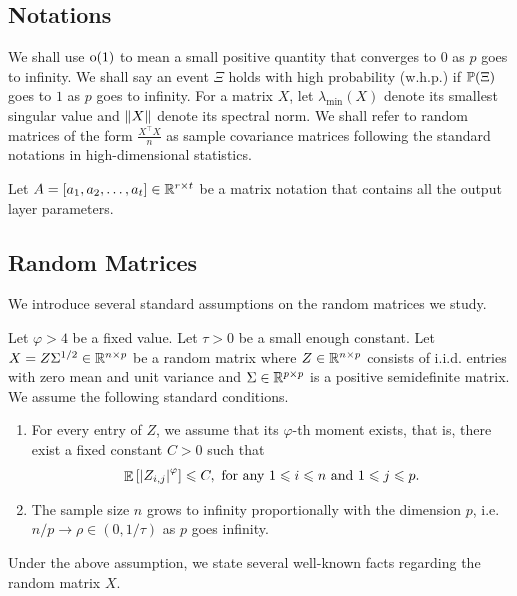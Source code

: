 \subsection{Notations}
We shall use $\oo(1)$ to mean a small positive quantity that converges to 0 as $p$ goes to infinity.
We shall say an event $\Xi$ holds with high probability (w.h.p.) if $\P(\Xi)$ goes to $1$ as $p$ goes to infinity.
For a matrix $X$, let $\lambda_{\min}(X)$ denote its smallest singular value and $\norm{X}$ denote its spectral norm.
We shall refer to random matrices of the form $\frac {X^\top X} n$ as sample covariance matrices following the standard notations in high-dimensional statistics.


Let $A = [a_1, a_2, \dots, a_t] \in \real^{r\times t}$ be a matrix notation that contains all the output layer parameters.

\subsection{Random Matrices}

We introduce several standard assumptions on the random matrices we study.
\begin{assumption}\label{assume_rm}
	Let $\varphi > 4$ be a fixed value.
	Let $\tau > 0$ be a small enough constant.
	Let $X = Z \Sigma^{1/2} \in\real^{n\times p}$ be a random matrix where $Z \in \real^{n\times p}$ consists of i.i.d. entries with zero mean and unit variance and $\Sigma \in \real^{p\times p}$ is a positive semidefinite matrix.
	We assume the following standard conditions.
	\begin{enumerate}
		\item For every entry of $Z$, we assume that its $\varphi$-th moment exists, that is, there exist a fixed constant $C > 0$ such that
			\begin{align}\label{assmAhigh}
				\ex{\abs{Z_{i,j}}^{\varphi}} \le C, \text{ for any } 1\le i \le n \text{ and } 1\le j \le p.
			\end{align}
		\item The sample size $n$ grows to infinity proportionally with the dimension $p$, i.e. $n / p \rightarrow \rho \in (0, 1/\tau)$ as $p$ goes infinity.
	\end{enumerate}
\end{assumption}

Under the above assumption, we state several well-known facts regarding the random matrix $X$.

